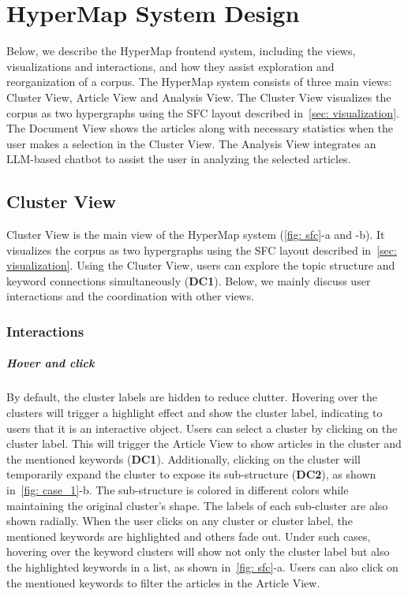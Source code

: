 \section{HyperMap System Design}
Below, we describe the HyperMap frontend system, including the views, visualizations and interactions, and how they assist exploration and reorganization of a corpus.
The HyperMap system consists of three main views: Cluster View, Article View and Analysis View.
The Cluster View visualizes the corpus as two hypergraphs using the SFC layout described in~\autoref{sec: visualization}.
The Document View shows the articles along with necessary statistics when the user makes a selection in the Cluster View.
The Analysis View integrates an LLM-based chatbot to assist the user in analyzing the selected articles. 
\subsection{Cluster View}
Cluster View is the main view of the HyperMap system (\autoref{fig: sfc}-a and -b).
It visualizes the corpus as two hypergraphs using the SFC layout described in~\autoref{sec: visualization}.
Using the Cluster View, users can explore the topic structure and keyword connections simultaneously (\textbf{DC1}).
Below, we mainly discuss user interactions and the coordination with other views.
\vspace*{-0.1cm}
\subsubsection{Interactions}
\subparagraph*{Hover and click}
By default, the cluster labels are hidden to reduce clutter.
Hovering over the clusters will trigger a highlight effect and show the cluster label, indicating to users that it is an interactive object.
Users can select a cluster by clicking on the cluster label.
This will trigger the Article View to show articles in the cluster and the mentioned keywords (\textbf{DC1}).
Additionally, clicking on the cluster will temporarily expand the cluster to expose its sub-structure (\textbf{DC2}), as shown in~\autoref{fig: case_1}-b.
The sub-structure is colored in different colors while maintaining the original cluster's shape.
The labels of each sub-cluster are also shown radially.
When the user clicks on any cluster or cluster label, the mentioned keywords are highlighted and others fade out.
Under such cases, hovering over the keyword clusters will show not only the cluster label but also the highlighted keywords in a list, as shown in~\autoref{fig: sfc}-a.
Users can also click on the mentioned keywords to filter the articles in the Article View.

